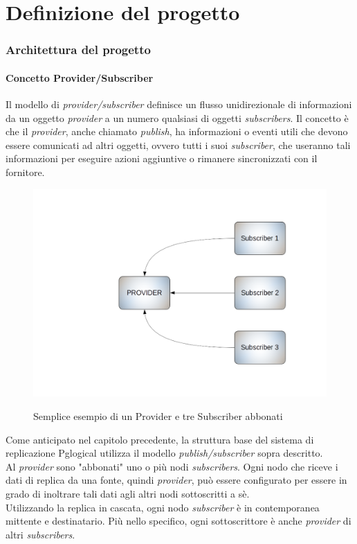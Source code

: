 \chapter{Definizione del progetto}
\setcounter{section}{1}
\item
\subsection{Architettura del progetto}
\subsubsection{Concetto Provider/Subscriber}
Il modello di \textit{provider/subscriber} definisce un flusso unidirezionale di informazioni da un oggetto \textit{provider} a un numero qualsiasi di oggetti \textit{subscribers}. Il concetto \`{e} che il \textit{provider}, anche chiamato \textit{publish}, ha informazioni o eventi utili che devono essere comunicati ad altri oggetti, ovvero tutti i suoi \textit{subscriber}, che useranno tali informazioni per eseguire azioni aggiuntive o rimanere sincronizzati con il fornitore. 

\begin{figure}[htbp]
\centering
\includegraphics[scale=0.40]{img/pubsub_1.png}\\
\caption{Semplice esempio di un Provider e tre Subscriber abbonati \label{figura1.14}}
\end{figure}

Come anticipato nel capitolo precedente, la struttura base del sistema di replicazione Pglogical utilizza il modello \textit{publish/subscriber} sopra descritto.\\
Al \textit{provider} sono "abbonati" uno o pi\`{u} nodi \textit{subscribers}. Ogni nodo che riceve i dati di replica da una fonte, quindi \textit{provider}, pu\`{o} essere configurato per essere in grado di inoltrare tali dati agli altri nodi sottoscritti a s\`{e}.\\
Utilizzando la replica in cascata, ogni nodo \textit{subscriber} \`{e} in contemporanea mittente e destinatario. Pi\`{u} nello specifico, ogni sottoscrittore \`{e} anche \textit{provider} di altri \textit{subscribers}.\\ 

